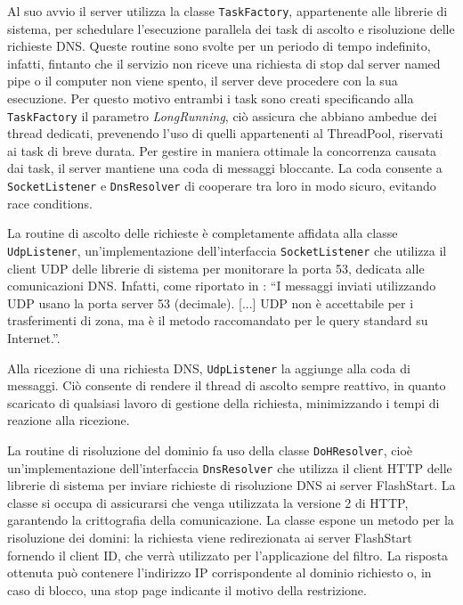 \documentclass[12pt,a4paper,openright,twoside]{book}
\newcommand{\class}[1]{\texttt{#1}}
\begin{document}
Al suo avvio il server utilizza la classe \class{TaskFactory}, appartenente alle librerie di sistema, per schedulare l'esecuzione parallela dei task di ascolto e risoluzione delle richieste \gls{DNS}.
Queste routine sono svolte per un periodo di tempo indefinito, infatti, fintanto che il servizio non riceve una richiesta di stop dal server named pipe o il computer non viene spento, il server deve procedere con la sua esecuzione.
Per questo motivo entrambi i task sono creati specificando alla \class{TaskFactory} il parametro \textit{LongRunning}, ciò assicura che abbiano ambedue dei thread dedicati, prevenendo l'uso di quelli appartenenti al ThreadPool, riservati ai task di breve durata.
Per gestire in maniera ottimale la concorrenza causata dai task, il server mantiene una coda di messaggi bloccante.
La coda consente a \class{SocketListener} e \class{DnsResolver} di cooperare tra loro in modo sicuro, evitando race conditions.

La routine di ascolto delle richieste è completamente affidata alla classe \class{UdpListener}, un'implementazione dell'interfaccia \class{SocketListener} che utilizza il client UDP delle librerie di sistema per monitorare la porta 53, dedicata alle comunicazioni \gls{DNS}.
Infatti, come riportato in \cite{RFC1035}: ``I messaggi inviati utilizzando UDP usano la porta server 53 (decimale). [...] UDP non è accettabile per i trasferimenti di zona, ma è il metodo raccomandato per le query standard su Internet.''.

Alla ricezione di una richiesta \gls{DNS}, \class{UdpListener} la aggiunge alla coda di messaggi.
Ciò consente di rendere il thread di ascolto sempre reattivo, in quanto scaricato di qualsiasi lavoro di gestione della richiesta, minimizzando i tempi di reazione alla ricezione.


La routine di risoluzione del dominio fa uso della classe \class{DoHResolver}, cioè un'implementazione dell'interfaccia \class{DnsResolver} che utilizza il client HTTP delle librerie di sistema per inviare richieste di risoluzione \gls{DNS} ai server FlashStart.
La classe si occupa di assicurarsi che venga utilizzata la versione 2 di HTTP, garantendo la crittografia della comunicazione.
La classe espone un metodo per la risoluzione dei domini: la richiesta viene redirezionata ai server FlashStart fornendo il client ID, che verrà utilizzato per l'applicazione del filtro.
La risposta ottenuta può contenere l'indirizzo IP corrispondente al dominio richiesto o, in caso di blocco, una stop page indicante il motivo della restrizione.  
\end{document}
